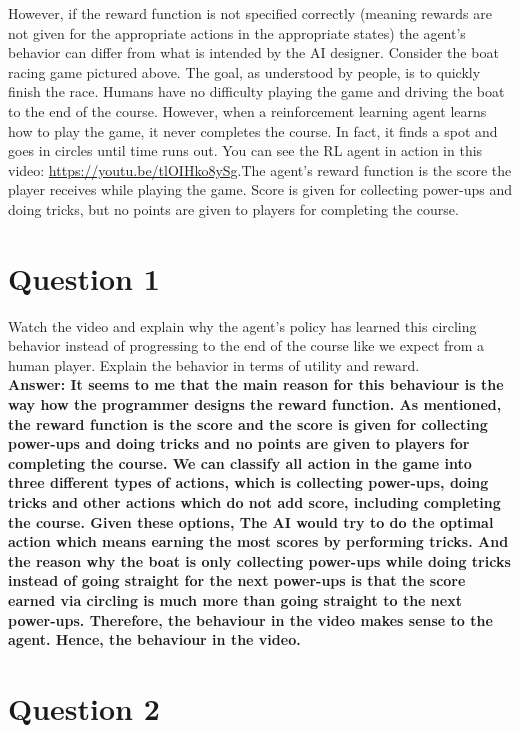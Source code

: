 \documentclass[12pt]{extarticle}
\begin{document}
\noindent However, if the reward function is not specified correctly (meaning rewards are not given for the appropriate actions in the appropriate states) the agent’s behavior can differ from what is intended by the AI designer. Consider the boat racing game pictured above. The goal, as understood by people, is to quickly finish the race. Humans have no difficulty playing the game and driving the boat to the end of the course. However, when a reinforcement learning agent learns how to play the game, it never completes the course. In fact, it finds a spot and goes in circles until time runs out. You can see the RL agent in action in this video: \href{https://youtu.be/tlOIHko8ySg}{https://youtu.be/tlOIHko8ySg}.The agent’s reward function is the score the player receives while playing the game. Score is given for collecting power-ups and doing tricks, but no points are given to players for completing the course.

\newpage
\section*{Question 1}

Watch the video and explain why the agent’s policy has learned this circling behavior instead of progressing to the end of the course like we expect from a human player. Explain the behavior in terms of utility and reward. \\

\noindent\textbf{Answer: It seems to me that the main reason for this behaviour is the way how the programmer designs the reward function. As mentioned, the reward function is the score and the score is given for collecting power-ups and doing tricks and no points are given to players for completing the course. We can classify all action in the game into three different types of actions, which is collecting power-ups, doing tricks and other actions which do not add score, including completing the course. Given these options, The AI would try to do the optimal action which means earning the most scores by performing tricks. And the reason why the boat is only collecting power-ups while doing tricks instead of going straight for the next power-ups is that the score earned via circling is much more than going straight to the next power-ups. Therefore, the behaviour in the video makes sense to the agent. Hence, the behaviour in the video.
}

\newpage
\section*{Question 2}
\end{document}

